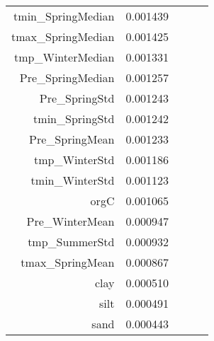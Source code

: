 \begin{tabular}{rrrrr}
tmin_SpringMedian & 0.001439 \\
tmax_SpringMedian & 0.001425 \\
tmp_WinterMedian & 0.001331 \\
Pre_SpringMedian & 0.001257 \\
Pre_SpringStd & 0.001243 \\
tmin_SpringStd & 0.001242 \\
Pre_SpringMean & 0.001233 \\
tmp_WinterStd & 0.001186 \\
tmin_WinterStd & 0.001123 \\
orgC & 0.001065 \\
Pre_WinterMean & 0.000947 \\
tmp_SummerStd & 0.000932 \\
tmax_SpringMean & 0.000867 \\
clay & 0.000510 \\
silt & 0.000491 \\
sand & 0.000443 \\
\bottomrule
\end{tabular}
